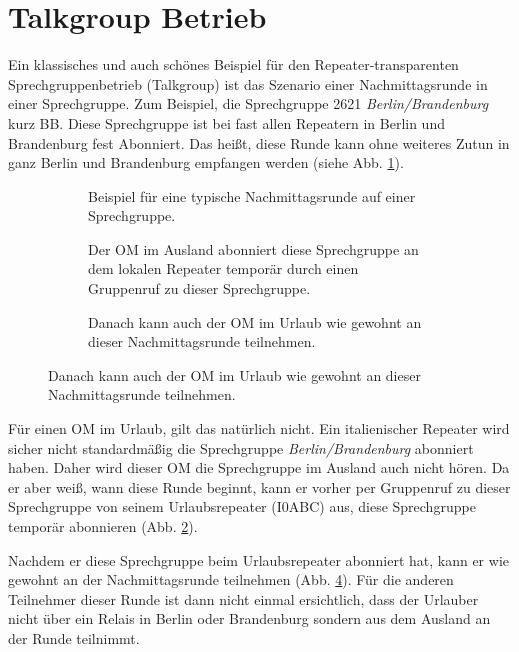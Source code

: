 \section{Talkgroup Betrieb} \label{sec:talkgroup}
Ein klassisches und auch schönes Beispiel für den Repeater-transparenten Sprechgruppenbetrieb (Talkgroup) ist das Szenario einer Nachmittagsrunde in einer Sprechgruppe. Zum Beispiel, die Sprechgruppe 2621 \emph{Berlin/Brandenburg} kurz BB. Diese Sprechgruppe ist bei fast allen Repeatern in Berlin und Brandenburg fest Abonniert. Das heißt, diese Runde kann ohne weiteres Zutun in ganz Berlin und Brandenburg empfangen werden (siehe Abb. \ref{fig:tgex1}). 

\begin{figure}[p]
 \centering
 \begin{subfigure}{\linewidth}
  \centering
  
  \caption{Beispiel für eine typische Nachmittagsrunde auf einer Sprechgruppe.} \label{fig:tgex1}
 \end{subfigure}
 \begin{subfigure}{\linewidth}
  \centering
  
  \caption{Der OM im Ausland abonniert diese Sprechgruppe an dem lokalen Repeater temporär durch einen Gruppenruf zu dieser Sprechgruppe.} \label{fig:tgex2}
 \end{subfigure}
 \begin{subfigure}{\linewidth}
  \centering
  
  \caption{Danach kann auch der OM im Urlaub wie gewohnt an dieser Nachmittagsrunde teilnehmen.} \label{fig:tgex3}
 \end{subfigure}
\end{figure}

Für einen OM im Urlaub, gilt das natürlich nicht. Ein italienischer Repeater wird sicher nicht standardmäßig die Sprechgruppe \emph{Berlin/Brandenburg} abonniert haben. Daher wird dieser OM die Sprechgruppe im Ausland auch nicht hören. Da er aber weiß, wann diese Runde beginnt, kann er vorher per Gruppenruf zu dieser Sprechgruppe von seinem Urlaubsrepeater (I0ABC) aus, diese Sprechgruppe temporär abonnieren (Abb. \ref{fig:tgex2}). 

Nachdem er diese Sprechgruppe beim Urlaubsrepeater abonniert hat, kann er wie gewohnt an der Nachmittagsrunde teilnehmen (Abb. \ref{fig:tgex3}). Für die anderen Teilnehmer dieser Runde ist dann nicht einmal ersichtlich, dass der Urlauber nicht über ein Relais in Berlin oder Brandenburg sondern aus dem Ausland an der Runde teilnimmt.

